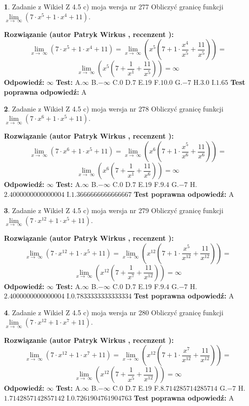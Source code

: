 \documentclass[12pt, a4paper]{article}
\theoremstyle{definition} %
\newtheorem{zad}{}
\newcommand{\zadStart}[1]{\begin{zad}#1\newline}
\newcommand{\zadStop}{\end{zad}}
\newcommand{\rozwStart}[2]{\noindent \textbf{Rozwiązanie (autor #1 , recenzent #2): }\newline}
\newcommand{\rozwStop}{\newline}
\newcommand{\odpStart}{\noindent \textbf{Odpowiedź:}\newline}
\newcommand{\odpStop}{\newline}
\newcommand{\testStart}{\noindent \textbf{Test:}\newline}
\newcommand{\testStop}{\newline}
\newcommand{\kluczStart}{\noindent \textbf{Test poprawna odpowiedź:}\newline}
\newcommand{\kluczStop}{\newline}
\begin{document}
\zadStart{Zadanie z Wikieł Z 4.5 c) moja wersja nr 277}
Obliczyć granicę funkcji  $\lim\limits_{x\to\ \infty}(7 \cdot x^{5}+1 \cdot x^{4}+11)$.
\zadStop
\rozwStart{Patryk Wirkus}{}
$$\lim\limits_{x\to\ \infty}(7 \cdot x^{5}+1 \cdot x^{4}+11) = \lim\limits_{x\to\ \infty}(x^{5}(7 +1 \cdot \frac{x^{4}}{x^{5}}+\frac{11}{x^{5}})) =$$ $$\lim\limits_{x\to\ \infty}(x^{5}(7 +\frac{1}{x^{1}}+\frac{11}{x^{5}})) =\infty$$
\rozwStop
\odpStart
$\infty$
\odpStop
\testStart
A.$\infty$ B.$-\infty$ C.$0$ D.$7$ E.$19$
F.$10.0$ G.$-7$
H.$3.0$
I.$1.65$
\testStop
\kluczStart
A
\kluczStop



\zadStart{Zadanie z Wikieł Z 4.5 c) moja wersja nr 278}
Obliczyć granicę funkcji  $\lim\limits_{x\to\ \infty}(7 \cdot x^{6}+1 \cdot x^{5}+11)$.
\zadStop
\rozwStart{Patryk Wirkus}{}
$$\lim\limits_{x\to\ \infty}(7 \cdot x^{6}+1 \cdot x^{5}+11) = \lim\limits_{x\to\ \infty}(x^{6}(7 +1 \cdot \frac{x^{5}}{x^{6}}+\frac{11}{x^{6}})) =$$ $$\lim\limits_{x\to\ \infty}(x^{6}(7 +\frac{1}{x^{1}}+\frac{11}{x^{6}})) =\infty$$
\rozwStop
\odpStart
$\infty$
\odpStop
\testStart
A.$\infty$ B.$-\infty$ C.$0$ D.$7$ E.$19$
F.$9.4$ G.$-7$
H.$2.4000000000000004$
I.$1.3666666666666667$
\testStop
\kluczStart
A
\kluczStop



\zadStart{Zadanie z Wikieł Z 4.5 c) moja wersja nr 279}
Obliczyć granicę funkcji  $\lim\limits_{x\to\ \infty}(7 \cdot x^{12}+1 \cdot x^{5}+11)$.
\zadStop
\rozwStart{Patryk Wirkus}{}
$$\lim\limits_{x\to\ \infty}(7 \cdot x^{12}+1 \cdot x^{5}+11) = \lim\limits_{x\to\ \infty}(x^{12}(7 +1 \cdot \frac{x^{5}}{x^{12}}+\frac{11}{x^{12}})) =$$ $$\lim\limits_{x\to\ \infty}(x^{12}(7 +\frac{1}{x^{7}}+\frac{11}{x^{12}})) =\infty$$
\rozwStop
\odpStart
$\infty$
\odpStop
\testStart
A.$\infty$ B.$-\infty$ C.$0$ D.$7$ E.$19$
F.$9.4$ G.$-7$
H.$2.4000000000000004$
I.$0.7833333333333334$
\testStop
\kluczStart
A
\kluczStop



\zadStart{Zadanie z Wikieł Z 4.5 c) moja wersja nr 280}
Obliczyć granicę funkcji  $\lim\limits_{x\to\ \infty}(7 \cdot x^{12}+1 \cdot x^{7}+11)$.
\zadStop
\rozwStart{Patryk Wirkus}{}
$$\lim\limits_{x\to\ \infty}(7 \cdot x^{12}+1 \cdot x^{7}+11) = \lim\limits_{x\to\ \infty}(x^{12}(7 +1 \cdot \frac{x^{7}}{x^{12}}+\frac{11}{x^{12}})) =$$ $$\lim\limits_{x\to\ \infty}(x^{12}(7 +\frac{1}{x^{5}}+\frac{11}{x^{12}})) =\infty$$
\rozwStop
\odpStart
$\infty$
\odpStop
\testStart
A.$\infty$ B.$-\infty$ C.$0$ D.$7$ E.$19$
F.$8.714285714285714$ G.$-7$
H.$1.7142857142857142$
I.$0.7261904761904763$
\testStop
\kluczStart
A
\kluczStop
\end{document}
